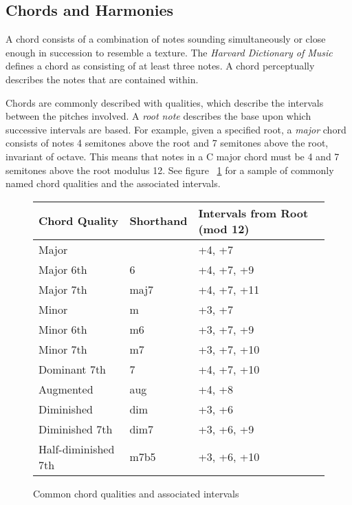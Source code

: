 \subsection{Chords and Harmonies}

A chord consists of a combination of notes sounding simultaneously or close enough in succession to resemble a texture. The \textit{Harvard Dictionary of Music} defines a chord as consisting of at least three notes\cite{harvdict}. A chord perceptually describes the notes that are contained within.

Chords are commonly described with qualities, which describe the intervals between the pitches involved. A \textit{root note} describes the base upon which successive intervals are based. For example, given a specified root, a \textit{major} chord consists of notes 4 semitones above the root and 7 semitones above the root, invariant of octave. This means that notes in a C major chord must be 4 and 7 semitones above the root modulus 12. See figure ~\ref{fig:qualitytable} for a sample of commonly named chord qualities and the associated intervals.

\begin{figure}[h!]
\begin{center}
\begin{tabular}{lll}
\toprule
Chord Quality       & Shorthand & Intervals from Root (mod 12) \\
\midrule
Major               &           & +4, +7     \\
Major 6th           & 6         & +4, +7, +9 \\
Major 7th           & maj7      & +4, +7, +11\\
Minor               & m         & +3, +7     \\
Minor 6th           & m6        & +3, +7, +9 \\
Minor 7th           & m7        & +3, +7, +10\\
Dominant 7th        & 7         & +4, +7, +10\\
Augmented           & aug       & +4, +8     \\
Diminished          & dim       & +3, +6     \\
Diminished 7th      & dim7      & +3, +6, +9 \\
Half-diminished 7th & m7b5      & +3, +6, +10\\
\bottomrule
\end{tabular}
\caption{Common chord qualities and associated intervals}
\label{fig:qualitytable}
\end{center}
\end{figure}

